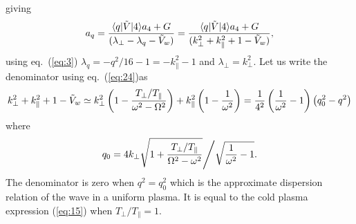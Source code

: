 \documentclass[12pt]{article}
\def\ket#1{|#1\rangle}
\def\bra#1{\langle#1}
\begin{document}
giving
\begin{equation}
  \label{eq:resonance}
  a_q = {\bra{q}|\tilde{V}\ket{4}a_4+G\over (\lambda_\perp-\lambda_q-\tilde{V}_{w})}
  ={\bra{q}|\tilde{V}\ket{4}a_4+G\over
    (k_\perp^2+k_\parallel^2+1-\tilde V_w) },
\end{equation}
using eq.\ (\ref{eq:3}) $\lambda_q=-q^2/16-1=-k_\parallel^2-1$ and
$\lambda_\perp=k_\perp^2$.
Let us write the denominator using eq.\ (\ref{eq:24})as
\begin{equation}
  \label{eq:25}
  k_\perp^2+k_\parallel^2+1-\tilde
  V_w\simeq k_\perp^2\left(1-{T_\perp/T_\parallel\over\omega^2-\Omega^2}\right)
  +k_\parallel^2\left(1-{1\over\omega^2}\right)
= {1\over4^2}\left({1\over\omega^2}-1\right)\left(q_0^2-q^2\right)
\end{equation}
where
\begin{equation}
  \label{eq:26}
  q_0=4k_\perp\sqrt{1+{T_\perp/T_\parallel\over\Omega^2-\omega^2}}
  \Bigg/\sqrt{{1\over\omega^2}-1}.
\end{equation}
The denominator is zero when $q^2=q_0^2$ which is the approximate
dispersion relation of the wave in a uniform plasma. It is equal to the cold
plasma expression (\ref{eq:15}) when $T_\perp/T_\parallel=1$.
\end{document}
